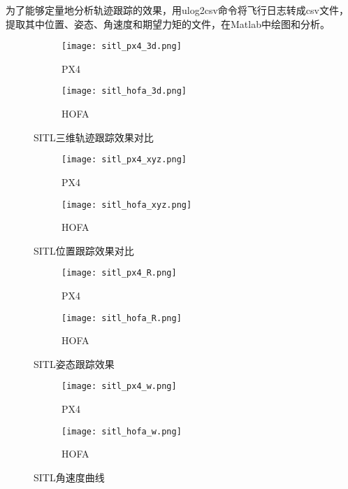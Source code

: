 为了能够定量地分析轨迹跟踪的效果，用ulog2csv命令将飞行日志转成csv文件，提取其中位置、姿态、角速度和期望力矩的文件，在Matlab中绘图和分析。

\begin{figure}[H]
  \centering
  \begin{subfigure}[b]{0.49\linewidth}
      \texttt{[image: sitl\_px4\_3d.png]}
      \caption{PX4}
  \end{subfigure}
  \hfill %
  \begin{subfigure}[b]{0.49\linewidth}
      \texttt{[image: sitl\_hofa\_3d.png]}
      \caption{HOFA}
  \end{subfigure}
  \caption{SITL三维轨迹跟踪效果对比}
\end{figure}

\newpage


  \begin{figure}[H]
    \centering
  \begin{subfigure}[b]{0.49\linewidth}
      \texttt{[image: sitl\_px4\_xyz.png]}
      \caption{PX4}
  \end{subfigure}
  \hfill
  \begin{subfigure}[b]{0.49\linewidth}
      \texttt{[image: sitl\_hofa\_xyz.png]}
      \caption{HOFA}
  \end{subfigure}
  \caption{SITL位置跟踪效果对比}
\end{figure}

\begin{figure}[H]
  \centering
\begin{subfigure}[b]{0.49\linewidth}
    \texttt{[image: sitl\_px4\_R.png]}
    \caption{PX4}
\end{subfigure}
\hfill
\begin{subfigure}[b]{0.49\linewidth}
    \texttt{[image: sitl\_hofa\_R.png]}
    \caption{HOFA}
\end{subfigure}
\caption{SITL姿态跟踪效果}
\end{figure}

\begin{figure}[H]
  \centering
\begin{subfigure}[b]{0.49\linewidth}
    \texttt{[image: sitl\_px4\_w.png]}
    \caption{PX4}
\end{subfigure}
\hfill
\begin{subfigure}[b]{0.49\linewidth}
    \texttt{[image: sitl\_hofa\_w.png]}
    \caption{HOFA}
\end{subfigure}
\caption{SITL角速度曲线}
\end{figure}


